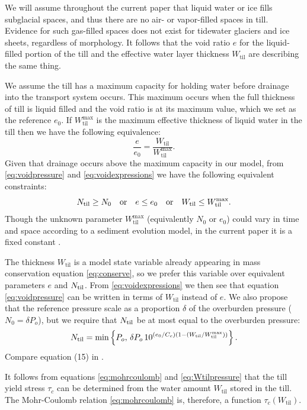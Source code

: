 \documentclass[gmd]{copernicus}   %
\newcommand{\text}{\textrm}
\newcommand{\Wtil}{W_{\text{til}}}
\newcommand{\Wtilmax}{W_{\text{til}}^{\text{max}}}
\begin{document}
We will assume throughout the current paper that liquid water or ice fills subglacial spaces, and thus there are no air- or vapor-filled spaces in till.  Evidence for such gas-filled spaces does not exist for tidewater glaciers and ice sheets, regardless of morphology.  It follows that the void ratio $e$ for the liquid-filled portion of the till and the effective water layer thickness $\Wtil$ are describing the same thing.

We assume the till has a maximum capacity for holding water before drainage into the transport system occurs.  This maximum occurs when the full thickness of till is liquid filled and the void ratio is at its maximum value, which we set as the reference $e_0$.  If $\Wtilmax$ is the maximum effective thickness of liquid water in the till then we have the following equivalence:
\begin{equation}
\frac{e}{e_0} = \frac{\Wtil}{\Wtilmax}. \label{eq:voidexpressions}
\end{equation}
Given that drainage occurs above the maximum capacity in our model, from \eqref{eq:voidpressure} and \eqref{eq:voidexpressions} we have the following equivalent constraints:
\begin{equation}
\Ntil \ge N_0 \quad \text{or} \quad e\le e_0 \quad \text{or} \quad \Wtil \le \Wtilmax. \label{eq:Wtilupperbound}
\end{equation}
Though the unknown parameter $\Wtilmax$ (equivalently $N_0$ or $e_0$) could vary in time and space according to a sediment evolution model, in the current paper it is a fixed constant \citep{TrufferEchelmeyerHarrison2001,BBssasliding}.

The thickness $\Wtil$ is a model state variable already appearing in mass conservation equation \eqref{eq:conserve}, so we prefer this variable over equivalent parameters $e$ and $\Ntil$.  From \eqref{eq:voidexpressions} we then see that equation \eqref{eq:voidpressure} can be written in terms of $\Wtil$ instead of $e$.  We also propose that the reference pressure scale as a proportion $\delta$ of the overburden pressure ($N_0 = \delta P_o$), but we require that $\Ntil$ be at most equal to the overburden pressure:
\begin{equation}
\Ntil = \min\left\{P_o,\, \delta P_o \, 10^{(e_0/C_c) \left(1 - (\Wtil/\Wtilmax)\right)}\right\}. \label{eq:Wtilpressure}
\end{equation}
Compare equation (15) in \cite{vanderWeletal2013}.

It follows from equations \eqref{eq:mohrcoulomb} and \eqref{eq:Wtilpressure} that the till yield stress $\tau_c$ can be determined from the water amount $\Wtil$ stored in the till.  The Mohr-Coulomb relation \eqref{eq:mohrcoulomb} is, therefore, a function $\tau_c(\Wtil)$.
\end{document}
